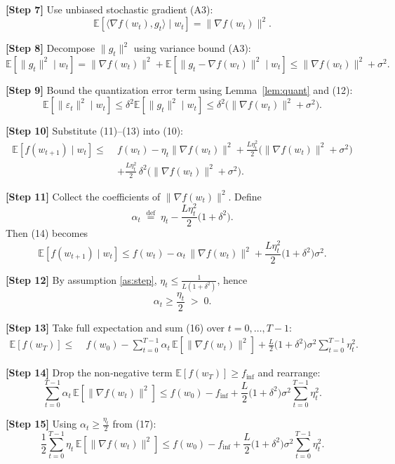 \documentclass{article}
\newcommand{\E}{\mathbb{E}}
\begin{document}
\noindent\textbf{[Step 7]} Use unbiased stochastic gradient (A3):
\[
\E[\langle\nabla f(w_{t}),g_{t}\rangle\mid w_{t}]
= \|\nabla f(w_{t})\|^{2}.
\tag{11}
\]

\noindent\textbf{[Step 8]} Decompose $\|g_{t}\|^{2}$ using variance bound (A3):
\[
\E[\|g_{t}\|^{2}\mid w_{t}]
= \|\nabla f(w_{t})\|^{2}+\E[\|g_{t}-\nabla f(w_{t})\|^{2}\mid w_{t}]
\le \|\nabla f(w_{t})\|^{2}+\sigma^{2}.
\tag{12}
\]

\noindent\textbf{[Step 9]} Bound the quantization error term using Lemma~\ref{lem:quant} and (12):
\[
\E[\|\varepsilon_{t}\|^{2}\mid w_{t}]
\le \delta^{2}\E[\|g_{t}\|^{2}\mid w_{t}]
\le \delta^{2}\big(\|\nabla f(w_{t})\|^{2}+\sigma^{2}\big).
\tag{13}
\]

\noindent\textbf{[Step 10]} Substitute (11)–(13) into (10):
\[
\begin{aligned}
\E[f(w_{t+1})\mid w_{t}]
\le\;& f(w_{t})
-\eta_{t}\|\nabla f(w_{t})\|^{2}
+\frac{L\eta_{t}^{2}}{2}\big(\|\nabla f(w_{t})\|^{2}+\sigma^{2}\big) \\
&+\frac{L\eta_{t}^{2}}{2}\,\delta^{2}\big(\|\nabla f(w_{t})\|^{2}+\sigma^{2}\big).
\end{aligned}
\tag{14}
\]

\noindent\textbf{[Step 11]} Collect the coefficients of $\|\nabla f(w_{t})\|^{2}$.
Define
\[
\alpha_{t}\;\stackrel{\text{def}}{=}\;
\eta_{t}
-\frac{L\eta_{t}^{2}}{2}\big(1+\delta^{2}\big).
\tag{15}
\]
Then (14) becomes
\[
\E[f(w_{t+1})\mid w_{t}]
\le f(w_{t})-\alpha_{t}\,\|\nabla f(w_{t})\|^{2}
+\frac{L\eta_{t}^{2}}{2}\big(1+\delta^{2}\big)\sigma^{2}.
\tag{16}
\]

\noindent\textbf{[Step 12]} By assumption \ref{as:step}, $\eta_{t}\le\frac{1}{L(1+\delta^{2})}$, hence
\[
\alpha_{t}\ge\frac{\eta_{t}}{2}\;>\;0.
\tag{17}
\]

\noindent\textbf{[Step 13]} Take full expectation and sum (16) over $t=0,\dots,T-1$:
\[
\begin{aligned}
\E[f(w_{T})]
\le\;& f(w_{0})
-\sum_{t=0}^{T-1}\alpha_{t}\,\E[\|\nabla f(w_{t})\|^{2}]
+\frac{L}{2}\big(1+\delta^{2}\big)\sigma^{2}\sum_{t=0}^{T-1}\eta_{t}^{2}.
\end{aligned}
\tag{18}
\]

\noindent\textbf{[Step 14]} Drop the non‑negative term $\E[f(w_{T})]\ge f_{\inf}$ and rearrange:
\[
\sum_{t=0}^{T-1}\alpha_{t}\,\E[\|\nabla f(w_{t})\|^{2}]
\le f(w_{0})-f_{\inf}
+\frac{L}{2}\big(1+\delta^{2}\big)\sigma^{2}\sum_{t=0}^{T-1}\eta_{t}^{2}.
\tag{19}
\]

\noindent\textbf{[Step 15]} Using $\alpha_{t}\ge\frac{\eta_{t}}{2}$ from (17):
\[
\frac{1}{2}\sum_{t=0}^{T-1}\eta_{t}\,\E[\|\nabla f(w_{t})\|^{2}]
\le f(w_{0})-f_{\inf}
+\frac{L}{2}\big(1+\delta^{2}\big)\sigma^{2}\sum_{t=0}^{T-1}\eta_{t}^{2}.
\tag{20}
\]
\end{document}
